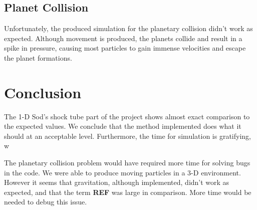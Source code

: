 \documentclass[12pt]{article}
\begin{document}
\subsection{Planet Collision}

Unfortunately, the produced simulation for the planetary collision didn't work as expected. Although movement is produced, the planets collide and result in a spike in pressure, causing most particles to gain immense velocities and escape the planet formations.

\section{Conclusion}

The 1-D Sod's shock tube part of the project shows almost exact comparison to the expected values. We conclude that the method implemented does what it should at an acceptable level. Furthermore, the time for simulation is gratifying, w

The planetary collision problem would have required more time for solving bugs in the code. We were able to produce moving particles in a 3-D environment. However it seems that gravitation, although implemented, didn't work as expected, and that the term \textbf{REF} was large in comparison. More time would be needed to debug this issue.

\newpage
{}
\printbibliography
\end{document}
